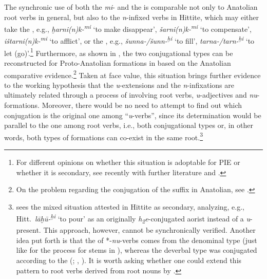 \documentclass[output=paper,colorlinks,citecolor=brown]{langscibook}
\begin{document}
The synchronic use of both the \textit{mi}-  and the  is comparable not only to Anatolian root verbs in general, but also to the \textit{n}-infixed verbs  in Hittite, which may either take the , e.g., \textit{ḫarni(n)k-\textsuperscript{mi}} ‘to make disappear’, \textit{šarni(n)k-\textsuperscript{mi}} ‘to compensate’, \textit{ištarni(n)k-\textsuperscript{mi}} ‘to afflict’, or the , e.g., \textit{šunna-/šunn-\textsuperscript{ḫi}} ‘to fill’, \textit{tarna-/tarn-\textsuperscript{ḫi}} ‘to let (go)’.\footnote{For different opinions on whether this situation is adoptable for PIE or whether it is secondary, see recently \citealt[107--108]{Melchert2022} with further literature and \citealt{VillanuevaSvenssonforth}.} Furthermore, as shown in \citealt[481--487]{Sasseville2021}, the two conjugational types can be reconstructed for Proto-Anatolian formations in  based on the Anatolian comparative evidence.\footnote{On the problem regarding the conjugation of the suffix  in Anatolian, see \citealt[176--177]{Oettinger2023}.} Taken at face value, this situation brings further evidence to the working hypothesis that the \textit{u}-extensions and the \textit{n}-infixations are ultimately related through a process of  involving root verbs, \textit{u}-adjectives and \textit{nu}-formations. Moreover, there would be no need to attempt to find out which conjugation is the original one among “\textit{u}-verbs”, since its determination would be parallel to the one among root verbs, i.e., both conjugational types or, in other words, both types of formations can co-exist in the same root.\footnote{\citet[67, fn.\ 24]{Jasanoff2023} sees the mixed situation attested in Hittite as secondary, analyzing,  e.g., Hitt.\ \textit{lāḫū-\textsuperscript{ḫi}} ‘to pour’ as an originally \textit{h\textsubscript{2}e}-conjugated  aorist instead of a \textit{u}-present. This approach, however, cannot be synchronically verified. Another idea put forth is that the  of *-\textit{nu}-verbs  comes from the denominal type (just like for the  process for stems in ), whereas the deverbal type was conjugated according to the  (\citealt[485--486]{Sasseville2021}; \citealt{VillanuevaSvensson2024}, \citeyear{VillanuevaSvenssonforth}). It is worth asking whether one could extend this pattern to root verbs derived from root nouns by .} 
\end{document}
